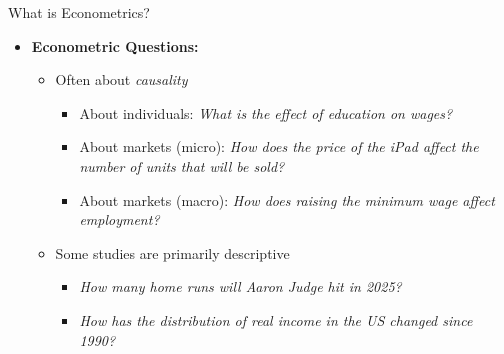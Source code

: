 \documentclass[aspectratio=169,11pt]{beamer}
\begin{document}
\begin{frame}{What is Econometrics?}
\begin{itemize}
	\item {\bf Econometric Questions:}
	\begin{itemize}
			\item Often about \emph{causality}
			\begin{itemize}
				\item About individuals: \emph{What is the effect of education on wages?}
				\item About markets (micro):   \emph{How does the price of the iPad affect the number of units that will be sold?}
				\item About markets (macro): \emph{How does raising the minimum wage affect employment?}
			\end{itemize}
			
			\bigskip
			\item Some studies are primarily descriptive 
			\begin{itemize}
				\item \emph{How many home runs will Aaron Judge hit in 2025?}
				\item \emph{How has the distribution of real income in the US changed since 1990?}
			\end{itemize}

	\end{itemize}				

\end{itemize}
\end{frame}
\end{document}
